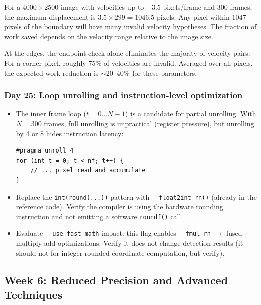 \documentclass[11pt,letterpaper]{article}
\begin{document}
\begin{notebox}
For a $4000 \times 2500$ image with velocities up to $\pm 3.5$
pixels/frame and 300 frames, the maximum displacement is $3.5 \times 299
= 1046.5$ pixels. Any pixel within 1047 pixels of the boundary will have
many invalid velocity hypotheses. The fraction of work saved depends on
the velocity range relative to the image size.

At the edges, the endpoint check alone eliminates the majority of velocity
pairs. For a corner pixel, roughly $75\%$ of velocities are invalid.
Averaged over all pixels, the expected work reduction is $\sim$20--40\%
for these parameters.
\end{notebox}

\subsubsection{Day 25: Loop unrolling and instruction-level optimization}

\begin{itemize}[leftmargin=2em]
    \item The inner frame loop ($t = 0 \ldots N-1$) is a candidate for
    partial unrolling. With $N = 300$ frames, full unrolling is impractical
    (register pressure), but unrolling by 4 or 8 hides instruction
    latency:

\begin{lstlisting}[style=cudastyle]
#pragma unroll 4
for (int t = 0; t < nf; t++) {
    // ... pixel read and accumulate
}
\end{lstlisting}

    \item Replace the \texttt{int(round(...))} pattern with
    \texttt{\_\_float2int\_rn()} (already in the reference code). Verify
    the compiler is using the hardware rounding instruction and not
    emitting a software \texttt{roundf()} call.

    \item Evaluate \texttt{-{}-use\_fast\_math} impact: this flag enables
    \texttt{\_\_fmul\_rn} $\to$ fused multiply-add optimizations. Verify
    it does not change detection results (it should not for integer-rounded
    coordinate computation, but verify).
\end{itemize}

\subsection{Week 6: Reduced Precision and Advanced Techniques}
\end{document}
